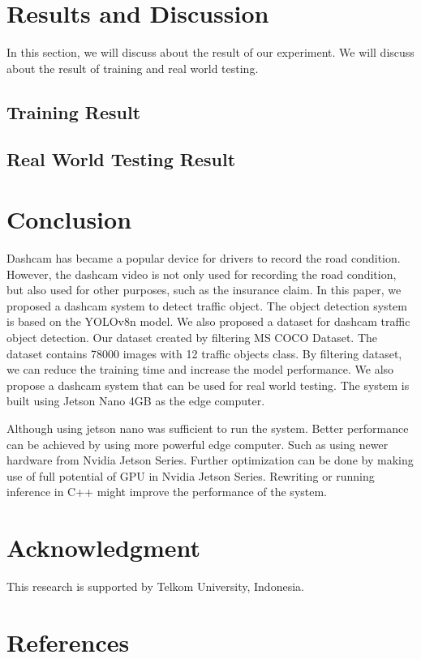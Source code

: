 \documentclass[conference]{IEEEtran}
\begin{document}
\section{Results and Discussion}
In this section, we will discuss about the result of our experiment. We will discuss about the result of training and real world testing.
\subsection{Training Result}

\subsection{Real World Testing Result}


\section{Conclusion}
Dashcam has became a popular device for drivers to record the road condition. However, the dashcam video is not only used for recording the road condition, but also used for other purposes, such as the insurance claim. 
In this paper, we proposed a dashcam system to detect traffic object. The object detection system is based on the YOLOv8n model. We also proposed a dataset for dashcam traffic object detection. Our dataset created by filtering MS COCO Dataset. The dataset contains 78000 images with 12 traffic objects class.
By filtering dataset, we can reduce the training time and increase the model performance.
We also propose a dashcam system that can be used for real world testing. The system is built using Jetson Nano 4GB as the edge computer.


Although using jetson nano was sufficient to run the system. Better performance can be achieved by using more powerful edge computer. Such as using newer hardware from Nvidia Jetson Series. Further optimization can be done by making use of full potential of GPU in Nvidia Jetson Series. Rewriting or running inference in C++ might improve the performance of the system.

\section*{Acknowledgment}

This research is supported by Telkom University, Indonesia.

\section*{References}
\end{document}
